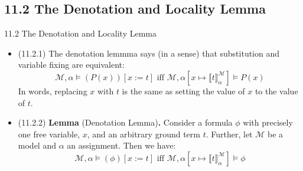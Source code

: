 \subsection{11.2 The Denotation and Locality Lemma}
\begin{frame}{11.2 The Denotation and Locality Lemma}

  \begin{itemize}

  \item (11.2.1) The denotation lemmma says (in a sense) that substitution and
    variable fixing are equivalent:
    \[\mathcal{M},\alpha\vDash (P(x))[x:=t]\text{ iff
      }\mathcal{M},\alpha[x\mapsto\llbracket
      t\rrbracket^\mathcal{M}_\alpha]\vDash P(x)\]
    In words, replacing $x$ with $t$ is the same as setting the value
    of $x$ to the value of $t$.

    \item (11.2.2) \textbf{Lemma} (Denotation Lemma)\textbf{.}
      Consider a formula $\phi$ with precisely one free
            variable, $x$, and an arbitrary ground term $t$. Further,
            let $\mathcal{M}$ be a model and
            $\alpha$ an assignment. Then we have:
            \[\mathcal{M},\alpha\vDash (\phi)[x:=t]\text{ iff
              }\mathcal{M},\alpha[x\mapsto \llbracket
              t\rrbracket^\mathcal{M}_\alpha]\vDash \phi\]
    
  \end{itemize}
  
\end{frame}

